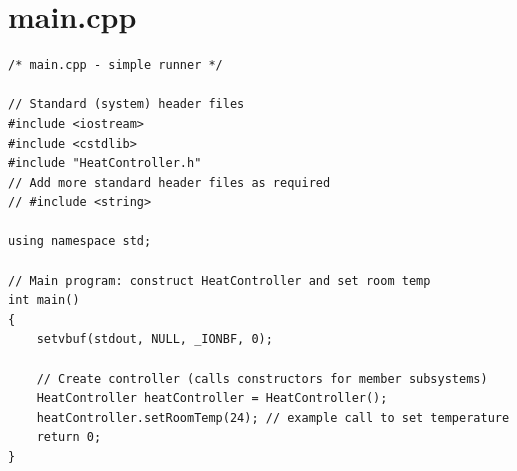 \documentclass[11pt]{article}
\begin{document}
\section*{main.cpp}
\begin{lstlisting}
/* main.cpp - simple runner */

// Standard (system) header files
#include <iostream>
#include <cstdlib>
#include "HeatController.h"
// Add more standard header files as required
// #include <string>

using namespace std;

// Main program: construct HeatController and set room temp
int main()
{
	setvbuf(stdout, NULL, _IONBF, 0);

    // Create controller (calls constructors for member subsystems)
    HeatController heatController = HeatController();
    heatController.setRoomTemp(24); // example call to set temperature
    return 0;
}
\end{lstlisting}
\end{document}
